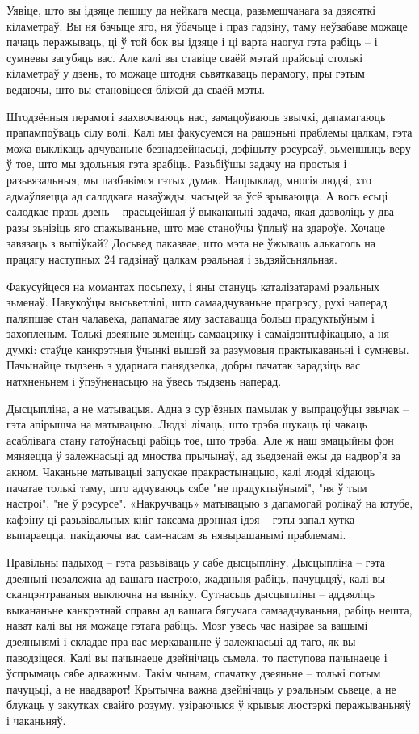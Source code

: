 Уявіце, што вы ідзяце пешшу да нейкага месца, разьмешчанага за дзясяткі кіламетраў. Вы ня бачыце яго, ня ўбачыце і праз гадзіну, таму неўзабаве можаце пачаць перажываць, ці ў той бок вы ідзяце і ці варта наогул гэта рабіць – і сумневы загубяць вас. Але калі вы ставіце сваёй мэтай прайсьці столькі кіламетраў у дзень, то можаце штодня сьвяткаваць перамогу, пры гэтым ведаючы, што вы становіцеся бліжэй да сваёй мэты.

Штодзённыя перамогі заахвочваюць нас, замацоўваюць звычкі, дапамагаюць прапампоўваць сілу волі. Калі мы факусуемся на рашэньні праблемы цалкам, гэта можа выклікаць адчуваньне безнадзейнасьці, дэфіцыту рэсурсаў, зьменшыць веру ў тое, што мы здольныя гэта зрабіць. Разьбіўшы задачу на простыя і разьвязальныя, мы пазбавімся гэтых думак. Напрыклад, многія людзі, хто адмаўляецца ад салодкага назаўжды, часьцей за ўсё зрываюцца. А вось есьці салодкае празь дзень – прасьцейшая ў выкананьні задача, якая дазволіць у два разы зьнізіць яго спажываньне, што мае станоўчы ўплыў на здароўе. Хочаце завязаць з выпіўкай? Досьвед паказвае, што мэта не ўжываць алькаголь на працягу наступных 24 гадзінаў цалкам рэальная і зьдзяйсьняльная.

Факусуйцеся на момантах посьпеху, і яны стануць каталізатарамі рэальных зьменаў. Навукоўцы высьветлілі, што самаадчуваньне прагрэсу, рухі наперад паляпшае стан чалавека, дапамагае яму заставацца больш прадуктыўным і захопленым. Толькі дзеяньне зьменіць самаацэнку і самаідэнтыфікацыю, а ня думкі: стаўце канкрэтныя ўчынкі вышэй за разумовыя практыкаваньні і сумневы. Пачынайце тыдзень з ударнага панядзелка, добры пачатак зарадзіць вас натхненьнем і ўпэўненасьцю на ўвесь тыдзень наперад.

Дысцыпліна, а не матывацыя. Адна з сур'ёзных памылак у выпрацоўцы звычак – гэта апірышча на матывацыю. Людзі лічаць, што трэба шукаць ці чакаць асаблівага стану гатоўнасьці рабіць тое, што трэба. Але ж наш эмацыйны фон мяняецца ў залежнасьці ад мноства прычынаў, ад зьедзенай ежы да надвор'я за акном. Чаканьне матывацыі запускае пракрастынацыю, калі людзі кідаюць пачатае толькі таму, што адчуваюць сябе "не прадуктыўнымі", "ня ў тым настроі", "не ў рэсурсе". «Накручваць» матывацыю з дапамогай ролікаў на ютубе, кафэіну ці разьвівальных кніг таксама дрэнная ідэя – гэты запал хутка выпараецца, пакідаючы вас сам-насам зь нявырашанымі праблемамі.

Правільны падыход – гэта разьвіваць у сабе дысцыпліну. Дысцыпліна – гэта дзеяньні незалежна ад вашага настрою, жаданьня рабіць, пачуцьцяў, калі вы сканцэнтраваныя выключна на выніку. Сутнасьць дысцыпліны – аддзяліць выкананьне канкрэтнай справы ад вашага бягучага самаадчуваньня, рабіць нешта, нават калі вы ня можаце гэтага рабіць. Мозг увесь час назірае за вашымі дзеяньнямі і складае пра вас меркаваньне ў залежнасьці ад таго, як вы паводзіцеся. Калі вы пачынаеце дзейнічаць сьмела, то паступова пачынаеце і ўспрымаць сябе адважным. Такім чынам, спачатку дзеяньне – толькі потым пачуцьці, а не наадварот! Крытычна важна дзейнічаць у рэальным сьвеце, а не блукаць у закутках свайго розуму, узіраючыся ў крывыя люстэркі перажываньняў і чаканьняў. 


